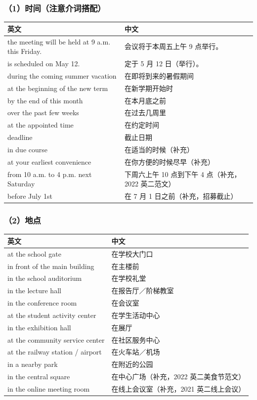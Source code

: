 \documentclass[11pt,a4paper]{ctexart}
\begin{document}
\subsubsection{（1）时间（注意介词搭配）}

\begin{longtable}{L{9.4cm}L{6.6cm}}
\toprule
\textbf{英文} & \textbf{中文} \\
\midrule
\endhead
\bottomrule
\endlastfoot
the meeting will be held at 9 a.m. this Friday. & 会议将于本周五上午 9 点举行。 \\
is scheduled on May 12. & 定于 5 月 12 日（举行）。 \\
during the coming summer vacation & 在即将到来的暑假期间 \\
at the beginning of the new term & 在新学期开始时 \\
by the end of this month & 在本月底之前 \\
over the past few weeks & 在过去几周里 \\
at the appointed time & 在约定时间 \\
deadline & 截止日期 \\
in due course & 在适当的时候（补充） \\
at your earliest convenience & 在你方便的时候尽早（补充） \\
from 10 a.m. to 4 p.m. next Saturday & 下周六上午 10 点到下午 4 点（补充，2022 英二范文） \\
before July 1st & 在 7 月 1 日之前（补充，招募截止） \\
\end{longtable}

\subsubsection{（2）地点}

\begin{longtable}{L{9.4cm}L{6.6cm}}
\toprule
\textbf{英文} & \textbf{中文} \\
\midrule
\endhead
\bottomrule
\endlastfoot
at the school gate & 在学校大门口 \\
in front of the main building & 在主楼前 \\
in the school auditorium & 在学校礼堂 \\
in the lecture hall & 在报告厅／阶梯教室 \\
in the conference room & 在会议室 \\
at the student activity center & 在学生活动中心 \\
in the exhibition hall & 在展厅 \\
at the community service center & 在社区服务中心 \\
at the railway station / airport & 在火车站／机场 \\
in a nearby park & 在附近的公园 \\
in the central square & 在中心广场（补充，2022 英二美食节范文） \\
in the online meeting room & 在线上会议室（补充，2021 英二线上会议） \\
\end{longtable}
\end{document}
